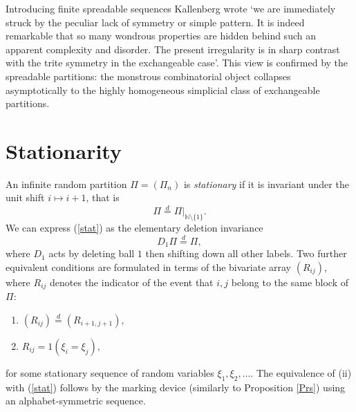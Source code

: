 \documentclass{article}
\begin{document}
Introducing finite spreadable sequences Kallenberg \cite{KallenbergPTRF} wrote 
`we are immediately struck by the peculiar lack of symmetry or simple pattern.
It is indeed remarkable that so many wondrous properties are hidden behind such
an apparent complexity and disorder. The present irregularity is in sharp contrast
with the trite symmetry in the exchangeable case'. 
This view is confirmed by the spreadable partitions: the  monstrous combinatorial object 
collapses asymptotically  to the highly homogeneous simplicial class of exchangeable partitions.





















\section{Stationarity}

\noindent
An infinite random partition $\Pi=(\Pi_n)$ is {\it stationary} if it  is invariant under the unit shift $i\mapsto i+1$, that is
\begin{equation}\label{stat}
\Pi\stackrel{d}{=} \Pi|_{{\mathbb N}\setminus\{1\}}.
\end{equation}
We can express (\ref{stat}) as the elementary deletion invariance
\begin{equation}\label{delstat}
D_1\Pi\stackrel{d}{=} \Pi,
\end{equation}
where $D_1$ acts by deleting ball $1$ then shifting down all other labels.
 Two further equivalent conditions are formulated in terms of the bivariate array $(R_{ij})$, where
$R_{ij}$ denotes the indicator of the event that $i,j$ belong to the same block of $\Pi$:
\begin{enumerate}
\item[(i)]  $(R_{ij})\stackrel{d}{=} (R_{i+1,j+1})$,
\item[(ii)]  
$R_{ij}=1(\xi_i=\xi_j),$
\end{enumerate}
for some stationary  sequence of random variables $\xi_1,\xi_2,\ldots$. The equivalence of (ii) with 
(\ref{stat}) follows by the marking device (similarly to Proposition \ref{Prs}) using an alphabet-symmetric sequence.
\end{document}

